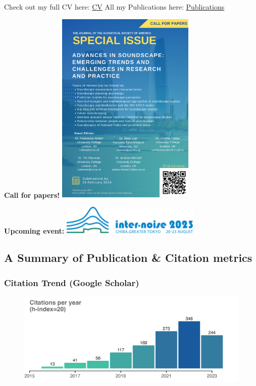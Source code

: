 \documentclass[
]{report}
\begin{document}
Check out my full CV here: \href{./cv/index.qmd}{
CV} All my Publications here:
\href{./publications/index.qmd}{ Publications}

 \textbf{Call for papers!}
\includegraphics[width=2.60417in,height=\textheight]{images/CALL FOR PAPERS.png}

 \textbf{Upcoming event:}
\href{https://internoise2023.org/}{\includegraphics[width=2.60417in,height=\textheight]{index_files/mediabag/images/logo-in2023.pdf}}

\hypertarget{fa-file-lines-a-summary-of-publication-citation-metrics}{%
\subsection{\texorpdfstring{ A Summary of Publication
\& Citation
metrics}{ A Summary of Publication \& Citation metrics}}\label{fa-file-lines-a-summary-of-publication-citation-metrics}}

\hypertarget{citation-trend-google-scholar}{%
\subsubsection{Citation Trend (Google
Scholar)}\label{citation-trend-google-scholar}}

\begin{figure}

{\centering \includegraphics{images/citeHistory.png}

}

\end{figure}
\end{document}
